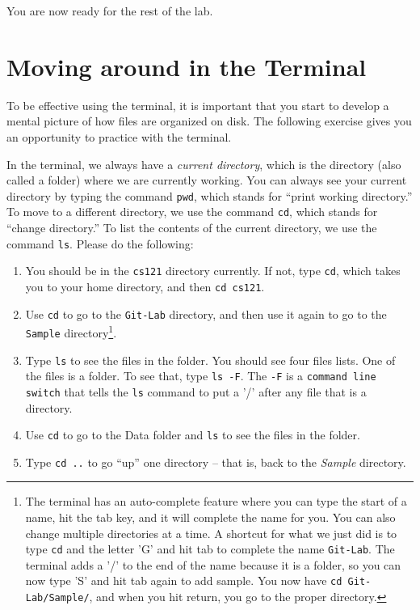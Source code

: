 \documentclass[11pt]{article}
\begin{document}
You are now ready for the rest of the lab.

\section*{Moving around in the Terminal}

To be effective using the terminal, it is important that you start to develop a mental picture of how files are organized on disk.  The following exercise gives you an opportunity to practice with the terminal.

In the terminal, we always have a {\em current directory}, which is the directory (also called a folder) where we are currently working.  You can always see your current directory by typing the command {\tt pwd}, which stands for ``print working directory.''  To move to a different directory, we use the command {\tt cd}, which stands for ``change directory.''  To list the contents of the current directory, we use the command {\tt ls}.  Please do the following:

\begin{enumerate}
\item You should be in the {\tt cs121} directory currently.  If not, type {\tt cd}, which takes you to your home directory, and then {\tt cd cs121}.

\item Use {\tt cd} to go to the {\tt Git-Lab} directory, and then use it again to go to the {\tt Sample} directory\footnote{The terminal has an auto-complete feature where you can type the start of a name, hit the tab key, and it will complete the name for you.  You can also change multiple directories at a time.  A shortcut for what we just did is to type {\tt cd} and the letter 'G' and hit tab to complete the name {\tt Git-Lab}. The terminal adds a '/' to the end of the name because it is a folder, so you can now type 'S' and hit tab again to add sample.  You now have {\tt cd Git-Lab/Sample/}, and when you hit return, you go to the proper directory.}.

\item Type {\tt ls} to see the files in the folder.  You should see four files lists.  One of the files is a folder.  To see that, type {\tt ls -F}.  The {\tt -F} is a {\tt command line switch} that tells the {\tt ls} command to put a '/' after any file that is a directory.

\item Use {\tt cd} to go to the Data folder and {\tt ls} to see the files in the folder.

\item Type {\tt cd ..} to go ``up'' one directory -- that is, back to the {\em Sample} directory.

\end{enumerate}
\end{document}
